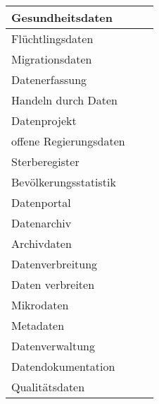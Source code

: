 \documentclass[
]{article}
\begin{document}
\begin{table}[H]
\begin{tabular}{l|l|l}
\hline
Gesundheitsdaten &  & \\
\hline
Flüchtlingsdaten &  & \\
\hline
Migrationsdaten &  & \\
\hline
Datenerfassung &  & \\
\hline
Handeln durch Daten &  & \\
\hline
Datenprojekt &  & \\
\hline
offene Regierungsdaten &  & \\
\hline
Sterberegister &  & \\
\hline
Bevölkerungsstatistik &  & \\
\hline
Datenportal &  & \\
\hline
Datenarchiv &  & \\
\hline
Archivdaten &  & \\
\hline
Datenverbreitung &  & \\
\hline
Daten verbreiten &  & \\
\hline
Mikrodaten &  & \\
\hline
Metadaten &  & \\
\hline
Datenverwaltung &  & \\
\hline
Datendokumentation &  & \\
\hline
Qualitätsdaten &  & \\
\hline
\end{tabular}
\endgroup{}
\end{table}
\end{document}
